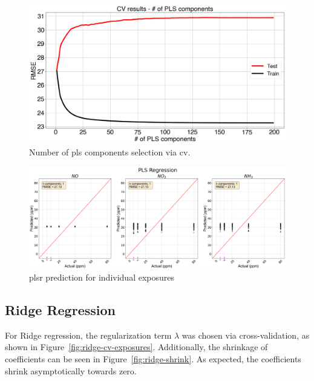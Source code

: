 \begin{figure}[h]
	\centering
	\includegraphics[width=1\textwidth]{../figures/pls-cv-exposures.png}
	\caption{Number of \acrshort{pls} components selection via \acrshort{cv}.}
	\label{fig:pls-cv-exposures}
\end{figure}

\begin{figure}[h]
	\centering
	\includegraphics[width=1\textwidth]{../figures/pls-exposures.png}
	\caption{\acrshort{plsr} prediction for individual exposures}
	\label{fig:plsr-exposures}
\end{figure}

\newpage
\subsection{Ridge Regression}

For Ridge regression, the regularization term $\lambda$ was chosen via cross-validation, as shown in Figure~\ref{fig:ridge-cv-exposures}. Additionally, the shrinkage of coefficients can be seen in Figure~\ref{fig:ridge-shrink}. As expected, the coefficients shrink asymptotically towards zero.

